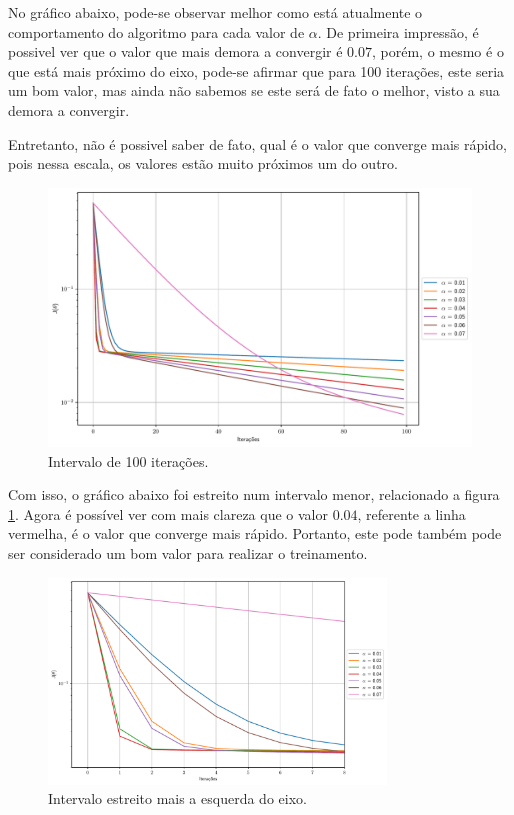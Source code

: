\documentclass[a4paper, 12pt]{article}
\begin{document}
No gráfico abaixo, pode-se observar melhor como está atualmente o comportamento do algoritmo para cada
valor de $\alpha$. De primeira impressão, é possivel ver que o valor que mais demora a convergir é $0.07$, porém,
o mesmo é o que está mais próximo do eixo, pode-se afirmar que para 100 iterações, este seria um bom valor,
mas ainda não sabemos se este será de fato o melhor, visto a sua demora a convergir.

Entretanto, não é possivel saber de fato, qual é o valor que converge mais rápido, pois nessa escala, os valores
estão muito próximos um do outro.
\begin{figure}[!h]
    \centering
    \includegraphics[width=.8\textwidth]{../imgs/lr_100it.pdf}
    \caption{Intervalo de 100 iterações.}
    \label{fig:lr_100it}
\end{figure}

Com isso, o gráfico abaixo foi estreito num intervalo menor, relacionado a figura \ref{fig:lr_100it}. Agora é possível
ver com mais clareza que o valor $0.04$, referente a linha vermelha, é o valor que converge mais rápido. Portanto,
este pode também pode ser considerado um bom valor para realizar o treinamento.
\begin{figure}[!h]
    \centering
    \includegraphics[width=0.8\textwidth]{../imgs/lower_interval.pdf}
    \caption{Intervalo estreito mais a esquerda do eixo.}
    \label{fig:lower_interval}
\end{figure}
\clearpage
\end{document}
